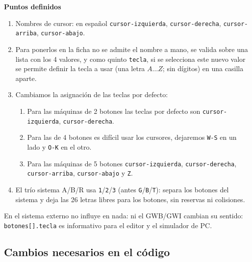 \textbf{Puntos definidos}
\begin{enumerate}
	\item Nombres de cursor: en español \texttt{cursor-izquierda}, \texttt{cursor-derecha}, \texttt{cursor-arriba},  \texttt{cursor-abajo}.
	
	\item Para ponerlos en la ficha no se admite el nombre a mano, se valida sobre una lista con los 4 valores, y como quinto \texttt{tecla}, si se selecciona este nuevo valor se permite definir la tecla a usar (una letra $A \dots Z$; sin dígitos) en una casilla aparte. 
	
	\item Cambiamos la asignación de las teclas por defecto:
	\begin{enumerate}
		\item Para las máquinas de 2 botones las teclas por defecto son \texttt{cursor-izquierda}, \texttt{cursor-derecha}. 
			
		\item Para las de 4 botones es difícil usar los cursores, dejaremos \texttt{W-S} en un lado y \texttt{O-K} en el otro.
		
		\item Para las máquinas de 5 botones \texttt{cursor-izquierda}, \texttt{cursor-derecha}, \texttt{cursor-arriba}, \texttt{cursor-abajo} y \texttt{Z}.
	\end{enumerate}
	
	\item El trío sistema A/B/R usa \texttt{1}/\texttt{2}/\texttt{3} (antes \texttt{G}/\texttt{B}/\texttt{T}): separa los botones del sistema y deja las 26 letras libres para los botones, sin reservas ni colisiones.
\end{enumerate}

En el sistema externo no influye en nada: ni el GWB/GWI cambian su sentido: \texttt{botones[].tecla} es informativo para el editor y el simulador de PC.

\subsection{Cambios necesarios en el código}
\label{sec:F5I17Codigo}

